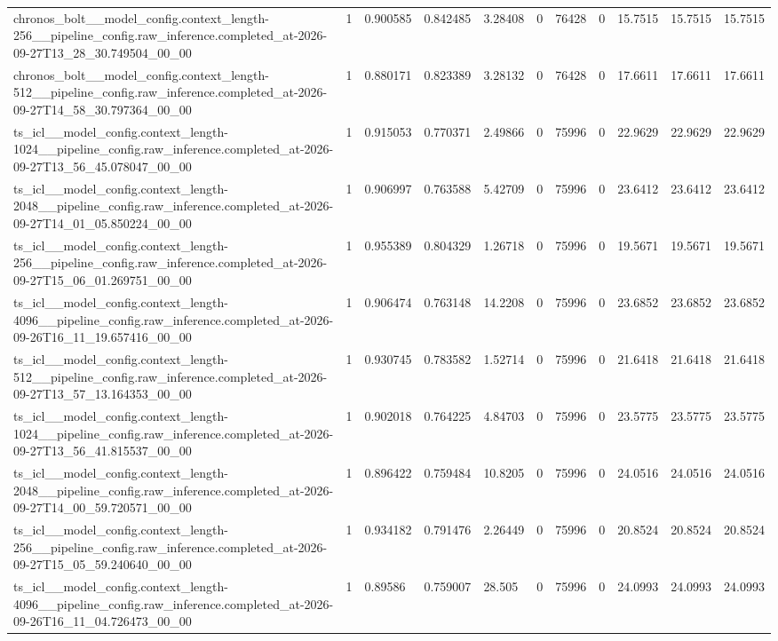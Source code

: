 \begin{tabular}{lllllllllll}
chronos\_bolt\_\_model\_config.context\_length-256\_\_pipeline\_config.raw\_inference.completed\_at-2026-09-27T13\_28\_30.749504\_00\_00 & 1 & 0.900585 & 0.842485 & 3.28408 & 0 & 76428 & 0 & 15.7515 & 15.7515 & 15.7515 \\
chronos\_bolt\_\_model\_config.context\_length-512\_\_pipeline\_config.raw\_inference.completed\_at-2026-09-27T14\_58\_30.797364\_00\_00 & 1 & 0.880171 & 0.823389 & 3.28132 & 0 & 76428 & 0 & 17.6611 & 17.6611 & 17.6611 \\
ts\_icl\_\_model\_config.context\_length-1024\_\_pipeline\_config.raw\_inference.completed\_at-2026-09-27T13\_56\_45.078047\_00\_00 & 1 & 0.915053 & 0.770371 & 2.49866 & 0 & 75996 & 0 & 22.9629 & 22.9629 & 22.9629 \\
ts\_icl\_\_model\_config.context\_length-2048\_\_pipeline\_config.raw\_inference.completed\_at-2026-09-27T14\_01\_05.850224\_00\_00 & 1 & 0.906997 & 0.763588 & 5.42709 & 0 & 75996 & 0 & 23.6412 & 23.6412 & 23.6412 \\
ts\_icl\_\_model\_config.context\_length-256\_\_pipeline\_config.raw\_inference.completed\_at-2026-09-27T15\_06\_01.269751\_00\_00 & 1 & 0.955389 & 0.804329 & 1.26718 & 0 & 75996 & 0 & 19.5671 & 19.5671 & 19.5671 \\
ts\_icl\_\_model\_config.context\_length-4096\_\_pipeline\_config.raw\_inference.completed\_at-2026-09-26T16\_11\_19.657416\_00\_00 & 1 & 0.906474 & 0.763148 & 14.2208 & 0 & 75996 & 0 & 23.6852 & 23.6852 & 23.6852 \\
ts\_icl\_\_model\_config.context\_length-512\_\_pipeline\_config.raw\_inference.completed\_at-2026-09-27T13\_57\_13.164353\_00\_00 & 1 & 0.930745 & 0.783582 & 1.52714 & 0 & 75996 & 0 & 21.6418 & 21.6418 & 21.6418 \\
ts\_icl\_\_model\_config.context\_length-1024\_\_pipeline\_config.raw\_inference.completed\_at-2026-09-27T13\_56\_41.815537\_00\_00 & 1 & 0.902018 & 0.764225 & 4.84703 & 0 & 75996 & 0 & 23.5775 & 23.5775 & 23.5775 \\
ts\_icl\_\_model\_config.context\_length-2048\_\_pipeline\_config.raw\_inference.completed\_at-2026-09-27T14\_00\_59.720571\_00\_00 & 1 & 0.896422 & 0.759484 & 10.8205 & 0 & 75996 & 0 & 24.0516 & 24.0516 & 24.0516 \\
ts\_icl\_\_model\_config.context\_length-256\_\_pipeline\_config.raw\_inference.completed\_at-2026-09-27T15\_05\_59.240640\_00\_00 & 1 & 0.934182 & 0.791476 & 2.26449 & 0 & 75996 & 0 & 20.8524 & 20.8524 & 20.8524 \\
ts\_icl\_\_model\_config.context\_length-4096\_\_pipeline\_config.raw\_inference.completed\_at-2026-09-26T16\_11\_04.726473\_00\_00 & 1 & 0.89586 & 0.759007 & 28.505 & 0 & 75996 & 0 & 24.0993 & 24.0993 & 24.0993 \\

\end{tabular}
